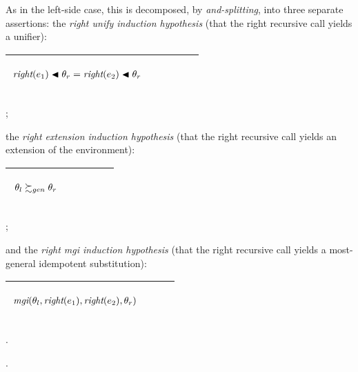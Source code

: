 \documentclass[runningheads]{llncs}
\DeclareMathOperator{\rig}{\emph{right}}
\DeclareMathOperator{\mgi}{\emph{mgi}}
\begin{document}
As in the left-side case, this is decomposed, by \emph{and-splitting}, into three separate assertions: the \emph{right unify induction hypothesis} (that the right recursive call yields a unifier):
\begin{center}
  \begin{tabular}{|m{}|m{}||m{}|}
\hline
\begin{center}
{$
\begin{aligned}
&\begin{aligned}
&\begin{aligned}
&\rig(\e{1}) \apply \thet{r} = 
 \rig(\e{2}) \apply \thet{r} 
\end{aligned}
\end{aligned}
\end{aligned} $}  \hspace{0cm} 
\end{center}& &  \\  \hline
\end{tabular};
\end{center}
 the \emph{right extension induction hypothesis} (that the right recursive call yields an extension of the environment):
\begin{center}
  \begin{tabular}{|m{}|m{}||m{}|}
\hline
\begin{center}
{$
\begin{aligned}
&\begin{aligned}
&\begin{aligned}
 \,\, & \theta_{l} \succsim_{gen} \theta_{r} 
\end{aligned}
\end{aligned}
\end{aligned} $}  \hspace{0cm} 
\end{center}& &  \\  \hline
\end{tabular};
\end{center}
and the \emph{right mgi induction hypothesis} (that the right recursive call yields a most-general idempotent substitution):

\begin{center}
  \begin{tabular}{|m{}|m{}||m{}|}
\hline
\begin{center}
{$
\begin{aligned}
&\mgi(\thet{l}, \rig(\e{1}), \rig(\e{2}), \thet{r})
\end{aligned}
 $}  \hspace{0cm} 
\end{center}& &  \\  \hline
\end{tabular}.
\end{center}
.
\end{document}
